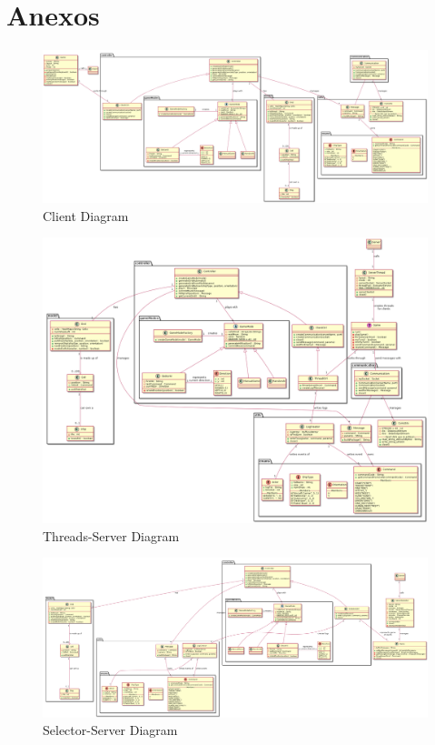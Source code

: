 \section*{Anexos}
\begin{figure}
    \includegraphics[width=\textwidth,height=\textheight,keepaspectratio]{../diagrams/class-diagrams/clientClasses.png}
    \caption{Client Diagram}
    \label{fig:PropProf}
\end{figure}
\begin{figure}
    \includegraphics[width=\textwidth,height=\textheight,keepaspectratio]{../diagrams/class-diagrams/threadsClasses.png}
    \caption{Threads-Server Diagram}
    \label{fig:PropProf}
\end{figure}
\begin{figure}
    \includegraphics[width=\textwidth,height=\textheight,keepaspectratio]{../diagrams/class-diagrams/selectorClasses.png}
    \caption{Selector-Server Diagram}
    \label{fig:PropProf}
\end{figure}


